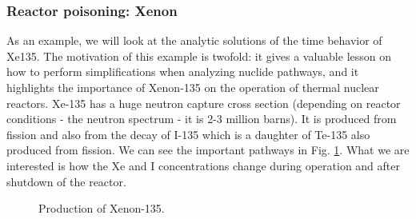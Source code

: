 
\subsubsection{Reactor poisoning: Xenon}

As an example, we will look at the analytic solutions of the time behavior of Xe135. The motivation of this example is twofold: it gives a valuable lesson on how to perform simplifications when analyzing nuclide pathways, and it highlights the importance of Xenon-135 on the operation of thermal nuclear reactors. Xe-135  has a huge neutron capture cross section (depending on reactor conditions - the neutron spectrum - it is 2-3 million barns). It is produced from fission and also from the decay of I-135 which is a daughter of Te-135 also  produced from fission. We can see the important pathways in Fig. \ref{fig:xenonprod}. What we are interested is how the Xe and I concentrations change during operation and after shutdown of the reactor.

\begin{figure}[ht!]
\protect {}\protect
\caption{\label{fig:xenonprod} \footnotesize{Production of Xenon-135.}}
\end{figure}

